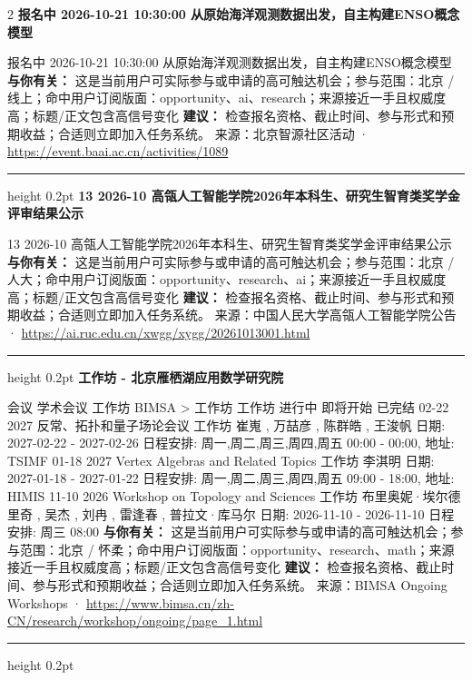 \documentclass[10.5pt]{ctexart}
\begin{document}
\begin{multicols}{2}
{\large\bfseries 报名中 2026-10-21 10:30:00 从原始海‮观洋‬测数据出发，自主构建ENSO概念模型}\par
报名中 2026-10-21 10:30:00 从原始海‮观洋‬测数据出发，自主构建ENSO概念模型
\textbf{与你有关：} 这是当前用户可实际参与或申请的高可触达机会；参与范围：北京 / 线上；命中用户订阅版面：opportunity、ai、research；来源接近一手且权威度高；标题/正文包含高信号变化
\textbf{建议：} 检查报名资格、截止时间、参与形式和预期收益；合适则立即加入任务系统。
{\footnotesize\color{ormuted} 来源：北京智源社区活动 · \url{https://event.baai.ac.cn/activities/1089}}
\vspace{2mm}
\hrule height 0.2pt
\vspace{2mm}
{\large\bfseries 13 2026-10 高瓴人工智能学院2026年本科生、研究生智育类奖学金评审结果公示}\par
13 2026-10 高瓴人工智能学院2026年本科生、研究生智育类奖学金评审结果公示
\textbf{与你有关：} 这是当前用户可实际参与或申请的高可触达机会；参与范围：北京 / 人大；命中用户订阅版面：opportunity、research、ai；来源接近一手且权威度高；标题/正文包含高信号变化
\textbf{建议：} 检查报名资格、截止时间、参与形式和预期收益；合适则立即加入任务系统。
{\footnotesize\color{ormuted} 来源：中国人民大学高瓴人工智能学院公告 · \url{https://ai.ruc.edu.cn/xwgg/xygg/20261013001.html}}
\vspace{2mm}
\hrule height 0.2pt
\vspace{2mm}
{\large\bfseries 工作坊 - 北京雁栖湖应用数学研究院}\par
会议 学术会议 工作坊 BIMSA > 工作坊 工作坊 进行中 即将开始 已完结 02-22 2027 反常、拓扑和量子场论会议 工作坊 崔嵬 , 万喆彦 , 陈群皓 , 王浚帆 日期: 2027-02-22 - 2027-02-26 日程安排: 周一,周二,周三,周四,周五 00:00 - 00:00, 地址: TSIMF 01-18 2027 Vertex Algebras and Related Topics 工作坊 李淇明 日期: 2027-01-18 - 2027-01-22 日程安排: 周一,周二,周三,周四,周五 09:00 - 18:00, 地址: HIMIS 11-10 2026 Workshop on Topology and Sciences 工作坊 布里奥妮·埃尔德里奇 , 吴杰 , 刘冉 , 雷逢春 , 普拉文·库马尔 日期: 2026-11-10 - 2026-11-10 日程安排: 周三 08:00
\textbf{与你有关：} 这是当前用户可实际参与或申请的高可触达机会；参与范围：北京 / 怀柔；命中用户订阅版面：opportunity、research、math；来源接近一手且权威度高；标题/正文包含高信号变化
\textbf{建议：} 检查报名资格、截止时间、参与形式和预期收益；合适则立即加入任务系统。
{\footnotesize\color{ormuted} 来源：BIMSA Ongoing Workshops · \url{https://www.bimsa.cn/zh-CN/research/workshop/ongoing/page_1.html}}
\vspace{2mm}
\hrule height 0.2pt

\end{multicols}
\end{document}
